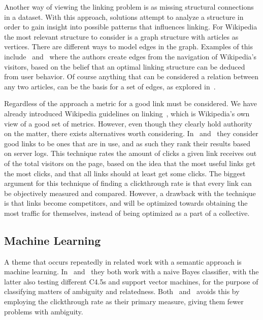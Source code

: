 Another way of viewing the linking problem is as missing structural connections in a dataset. With this approach, solutions attempt to analyze a structure in order to gain insight into possible patterns that influences linking. For Wikipedia the most relevant structure to consider is a graph structure with articles as vertices. There are different ways to model edges in the graph. Examples of this include~\cite{hyperlink-structure-using-logs} and~\cite{west2015mining} where the authors create edges from the navigation of Wikipedia's visitors, based on the belief that an optimal linking structure can be deduced from user behavior. Of course anything that can be considered a relation between any two articles, can be the basis for a set of edges, as explored in~\cite{lu2011link}.

Regardless of the approach a metric for a good link must be considered. We have already introduced Wikipedia guidelines on linking~\cite{wiki-editor-guidelines}, which is Wikipedia's own view of a good set of metrics. However, even though they clearly hold authority on the matter, there exists alternatives worth considering. In~\cite{hyperlink-structure-using-logs} and~\cite{west2015mining} they consider good links to be ones that are in use, and as such they rank their results based on server logs. This technique rates the amount of clicks a given link receives out of the total visitors on the page, based on the idea that the most useful links get the most clicks, and that all links should at least get some clicks. The biggest argument for this technique of finding a clickthrough rate is that every link can be objectively measured and compared. However, a drawback with the technique is that links become competitors, and will be optimized towards obtaining the most traffic for themselves, instead of being optimized as a part of a collective.

\subsection{Machine Learning}\label{related_machine_learning}

A theme that occurs repeatedly in related work with a semantic approach is machine learning. In~\cite{mihalcea2007wikify} and~\cite{milne2008learning} they both work with a naive Bayes classifier, with the latter also testing different C4.5s and support vector machines, for the purpose of classifying matters of ambiguity and relatedness. Both~\cite{hyperlink-structure-using-logs} and~\cite{west2015mining} avoids this by employing the clickthrough rate as their primary measure, giving them fewer problems with ambiguity.

